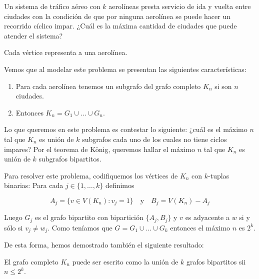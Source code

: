\begin{prob}\label{prob:aerolineas}
    Un sistema de tráfico aéreo con $k$ aerolíneas presta servicio de ida y vuelta entre ciudades con la condición de que por ninguna aerolínea se puede hacer un recorrido cíclico impar. ¿Cuál es la máxima cantidad de ciudades que puede atender el sistema?
    
    \begin{marginfigure}
        \centering
        \caption{Cada vértice representa a una aerolínea.}
        \label{fig:aerolineas}
    \end{marginfigure}
    
    Vemos que al modelar este problema se presentan las siguientes características:
    
    \begin{enumerate}
        \item Para cada aerolínea tenemos un subgrafo del grafo completo $K_n$ si son $n$ ciudades.
        \item Entonces $K_n = G_1 \cup \dots \cup G_n$.
    \end{enumerate}
    
    Lo que queremos en este problema es contestar lo siguiente: ¿cuál es el máximo $n$ tal que $K_n$ es unión de $k$ subgrafos cada uno de los cuales no tiene ciclos impares? Por el teorema de König, queremos hallar el máximo $n$ tal que $K_n$ es unión de $k$ subgrafos bipartitos.
    
    Para resolver este problema, codifiquemos los vértices de $K_n$ con $k$-tuplas binarias: Para cada $j \in \{1, \dots, k\}$ definimos
    
    \[
    A_j = \{v \in V(K_n) : v_j = 1\} \quad \text{y} \quad B_j = V(K_n) - A_j
    \]
    
    Luego $G_j$ es el grafo bipartito con bipartición $\{A_j, B_j\}$ y $v$ es adyacente a $w$ si y sólo si $v_j \neq w_j$. Como teníamos que $G = G_1 \cup \dots \cup G_k$ entonces el máximo $n$ es $2^k$.
\end{prob}

De esta forma, hemos demostrado también el siguiente resultado:

\begin{teo}
    El grafo completo $K_n$ puede ser escrito como la unión de $k$ grafos bipartitos sii $n \leq 2^k$.
\end{teo}

